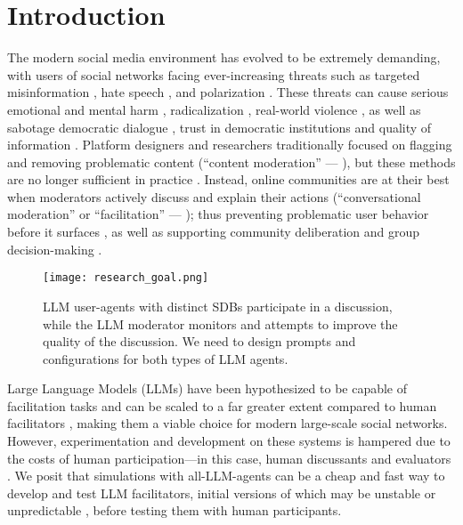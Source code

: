 %
\section{Introduction}
\label{sec:introduction}

The modern social media environment has evolved to be extremely demanding, with users of social networks facing ever-increasing threats such as targeted misinformation \cite{clemons2025disinformation, Denniss2025Social}, hate speech \cite{kolluri2025parler}, and polarization \cite{pranesh2024impactsocialmediapolarization}. These threats can cause serious emotional and mental harm \citep{proactive_moderation}, radicalization \citep{cho-etal-2024-language}, real-world violence \citep{schaffner_community_guidelines}, as well as sabotage democratic dialogue \citep{esau2017design, falk-etal-2021-predicting, seering_self_moderation}, trust in democratic institutions \citep{schroeder-etal-2024-fora} and quality of information \citep{make_reddit_great}. Platform designers and researchers traditionally focused on flagging and removing problematic content (``content moderation'' --- \citet{seering_self_moderation, cresci_pesonalized_interventions}), but these methods are no longer sufficient in practice \cite{horta_automated_moderation, schaffner_community_guidelines, small-polis-llm, korre2025evaluation}. Instead, online communities are at their best when moderators actively discuss and explain their actions (``conversational moderation'' or ``facilitation'' --- \citet{argyle2023, korre2025evaluation, falk-etal-2021-predicting}); thus preventing problematic user behavior before it surfaces \cite{cho-etal-2024-language, seering_self_moderation, cresci_pesonalized_interventions, make_reddit_great}, as well as supporting community deliberation and group decision-making \cite{kim_et_al_chatbot, seering_self_moderation}. 

\begin{figure}[t]
	\centering
	\texttt{[image: research\_goal.png]}
	\caption{LLM user-agents with distinct SDBs participate in a discussion, while the LLM moderator monitors and attempts to improve the quality of the discussion. We need to design prompts and configurations for both types of LLM agents.}
	\label{fig::goals}
\end{figure}

Large Language Models (LLMs) have been hypothesized to be capable of facilitation tasks and can be scaled to a far greater extent compared to human facilitators \cite{korre2025evaluation, small-polis-llm}, making them a viable choice for modern large-scale social networks. However, experimentation and development on these systems is hampered due to the costs of human participation---in this case, human discussants and evaluators \citep{rossi_2024}. We posit that simulations with all-LLM-agents can be a cheap and fast way to develop and test LLM facilitators, initial versions of which may be unstable or unpredictable \cite{atil_2025, rossi_2024}, before testing them with human participants. 

